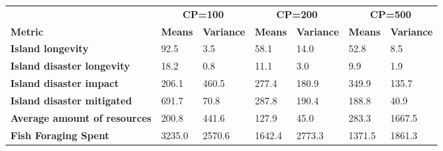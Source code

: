 \begin{center}
\begin{table}[h]
\begin{tabular}{l|ll|ll|ll}
                                     & \multicolumn{2}{c}{\textbf{CP=100}}                             & \multicolumn{2}{c}{\textbf{CP=200}}                               & \multicolumn{2}{c}{\textbf{CP=500}}                                        \\
\textbf{Metric}                      & \multicolumn{1}{c}{\textbf{Means}} & \multicolumn{1}{c}{\textbf{Variance}} & \multicolumn{1}{c}{\textbf{Means}} & \multicolumn{1}{c}{\textbf{Variance}} & \multicolumn{1}{c}{\textbf{Means}} & \multicolumn{1}{c}{\textbf{Variance}} \\ \hline
\textbf{Island longevity}            & 92.5                               & 3.5                                   & 58.1                               & 14.0                                  & 52.8                               & 8.5                                   \\
\textbf{Island disaster longevity}   & 18.2                               & 0.8                                   & 11.1                               & 3.0                                   & 9.9                                & 1.9                                   \\
\textbf{Island disaster impact}      & 206.1                              & 460.5                                 & 277.4                              & 180.9                                 & 349.9                              & 135.7                                 \\
\textbf{Island disaster mitigated}   & 691.7                              & 70.8                                  & 287.8                              & 190.4                                 & 188.8                              & 40.9                                  \\
\textbf{Average amount of resources} & 200.8                              & 441.6                                 & 127.9                              & 45.0                                  & 283.3                              & 1667.5                                \\
\textbf{Fish Foraging Spent}         & 3235.0                             & 2570.6                                & 1642.4                             & 2773.3                                & 1371.5                             & 1861.3                                \\

\end{tabular}
\end{table}
\end{center}
